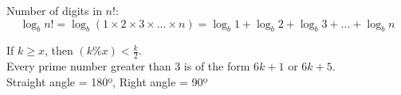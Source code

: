 Number of digits in $n!$:
  $$ \log _{b} n! = \log _{b} (1 \times 2 \times 3 \times ... \times n) = \log _{b} 1 + \log _{b} 2 + \log _{b} 3 + ... + \log _{b} n $$

If $k \geq x$, then $(k \% x) < \frac{k}{2}$.\\
\hfill \break
Every prime number greater than $3$ is of the form $6k + 1$ or $6k + 5$.\\
\hfill \break
Straight angle = 180º, Right angle = 90º